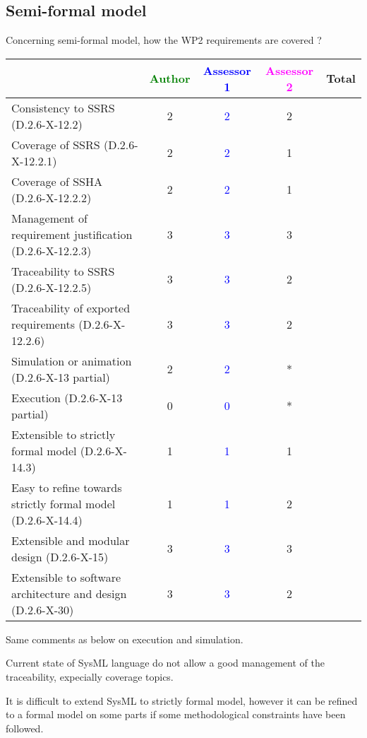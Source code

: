 \subsection{Semi-formal model}

Concerning semi-formal model, how the WP2 requirements are covered ?

\begin{tabular}{|l | c | c | c | c|}
\hline
& \textcolor{green}{Author} & \textcolor{blue}{Assessor 1} & \textcolor{magenta}{Assessor 2} & Total \\
\hline
Consistency to SSRS (D.2.6-X-12.2) & 2 & \textcolor{blue}{2} & 2 & \\
\hline
Coverage of SSRS (D.2.6-X-12.2.1) & 2 & \textcolor{blue}{2} & 1 & \\
\hline
Coverage of SSHA (D.2.6-X-12.2.2) & 2 & \textcolor{blue}{2} & 1 & \\
\hline
Management of requirement justification (D.2.6-X-12.2.3) & 3 & \textcolor{blue}{3} & 3 & \\
\hline
Traceability to SSRS (D.2.6-X-12.2.5) & 3 & \textcolor{blue}{3} & 2 & \\
\hline
Traceability of exported requirements (D.2.6-X-12.2.6) & 3 & \textcolor{blue}{3} & 2 & \\
\hline
Simulation or animation (D.2.6-X-13 partial) & 2 & \textcolor{blue}{2} &  * & \\
\hline
Execution (D.2.6-X-13 partial) & 0 & \textcolor{blue}{0} & * & \\
\hline
Extensible to strictly formal model (D.2.6-X-14.3) & 1 & \textcolor{blue}{1} & 1 & \\
\hline
Easy to refine towards strictly formal model (D.2.6-X-14.4) & 1 & \textcolor{blue}{1} & 2 & \\
\hline
Extensible and modular design (D.2.6-X-15) & 3 & \textcolor{blue}{3} & 3 & \\
\hline
Extensible to software architecture and design (D.2.6-X-30) & 3 & \textcolor{blue}{3} & 2 & \\
\hline
\end{tabular}



\begin{assessor2}
Same comments as below on execution and simulation.

Current state of SysML language do not allow a good management of the traceability, expecially coverage topics.

It is difficult to extend SysML to strictly formal model, however it can be refined to a formal model on some parts if some methodological constraints have been followed.
\end{assessor2}

